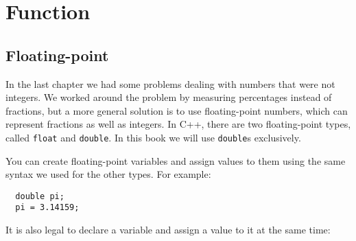 





\chapter{Function}

\section{Floating-point}

In the last chapter we had some problems dealing with numbers
that were not integers.  We worked around the problem by measuring
percentages instead of fractions, but a more general solution is
to use floating-point numbers, which can represent fractions
as well as integers.  In C++, there are two floating-point types,
called {\tt float} and {\tt double}.  In this book we will use
{\tt double}s exclusively.

You can create floating-point variables and assign values to them
using the same syntax we used for the other types.  For example:

\begin{verbatim}
  double pi;
  pi = 3.14159;
\end{verbatim}
%
It is also legal to declare a variable and assign a value to it at the
same time:

